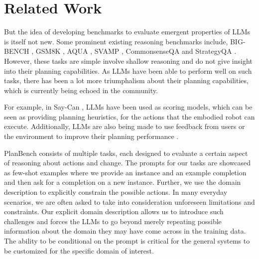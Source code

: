 \section{Related Work}
But the idea of developing benchmarks to evaluate emergent properties of LLMs is itself not new. Some prominent existing reasoning benchmarks include,  BIG-BENCH \cite{bigbench},  GSM8K \cite{cobbe2021training}, AQUA \cite{ling2017program}, SVAMP \cite{patel2021nlp}, CommonsenseQA \cite{talmor2018commonsenseqa} and StrategyQA \cite{geva2021did}. However, these tasks are simple involve shallow reasoning and do not give insight into their planning capabilities. As LLMs have been able to perform well on such tasks, there has been a lot more triumphalism about their planning capabilities, which is currently being echoed in the community. 

For example, in Say-Can \cite{ahn2022can}, LLMs have been used as scoring models, which can be seen as providing planning heuristics, for the actions that the embodied robot can execute. Additionally, LLMs are also being made to use feedback from users or the environment to improve their planning performance  \cite{huang2022inner, yao2023react, raman2022planning}. 

 PlanBench consists of multiple tasks, each designed to evaluate a certain aspect of reasoning about actions and change. The prompts for our tasks are showcased as few-shot examples where we provide an instance and an example completion and then ask for a completion on a new instance. Further, we use the domain description to explicitly constrain the possible actions. In many everyday scenarios, we are often asked to take into consideration unforeseen limitations and constraints. Our explicit domain description allows us to introduce such challenges and forces the LLMs to go beyond merely repeating possible information about the domain they may have come across in the training data. The ability to be conditional on the prompt is critical for the general systems to be customized for the specific domain of interest.
